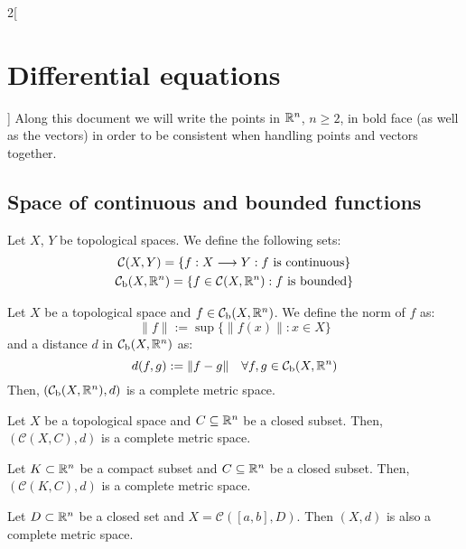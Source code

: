 \documentclass[../../../main.tex]{subfiles}
\begin{document}
\renewcommand{\col}{\apl}
\begin{multicols}{2}[\section{Differential equations}]
  Along this document we will write the points in $\mathbb{R}^n$, $n\geq 2$, in bold face (as well as the vectors) in order to be consistent when handling points and vectors together.
  \subsection{Space of continuous and bounded functions}
  \begin{definition}
    Let $X$, $Y$ be topological spaces. We define the following sets:
    \begin{gather*}
      \mathcal{C}(X,Y)=\{f:X\longrightarrow Y:f\text{ is continuous}\}\\
      \mathcal{C}_\text{b}(X,\mathbb{R}^n)=\{f\in\mathcal{C}(X,\mathbb{R}^n):f\text{ is bounded}\}
    \end{gather*}
  \end{definition}
  \begin{theorem}
    Let $X$ be a topological space and $f\in\mathcal{C}_\text{b}(X,\mathbb{R}^n)$. We define the norm of $f$ as: $$\|f\|:=\sup\{\|f(x)\|:x\in X\}$$ and a distance $d$ in $\mathcal{C}_\text{b}(X,\mathbb{R}^n)$ as: $$d(f,g):=\|f-g\|\quad\forall f,g\in\mathcal{C}_\text{b}(X,\mathbb{R}^n)$$
    Then, $(\mathcal{C}_\text{b}(X,\mathbb{R}^n),d)$ is a complete metric space.
  \end{theorem}
  \begin{theorem}
    Let $X$ be a topological space and $C\subseteq\mathbb{R}^n$ be a closed subset. Then, $(\mathcal{C}(X,C),d)$ is a complete metric space.
  \end{theorem}
  \begin{corollary}
    Let $K\subset \mathbb{R}^n$ be a compact subset and $C\subseteq\mathbb{R}^n$ be a closed subset. Then, $(\mathcal{C}(K,C),d)$ is a complete metric space.
  \end{corollary}
  \begin{corollary}
    Let $D\subset\mathbb{R}^n$ be a closed set and $X=\mathcal{C}([a,b],D)$. Then $(X,d)$ is also a complete metric space.
  \end{corollary}

\end{multicols}
\end{document}
